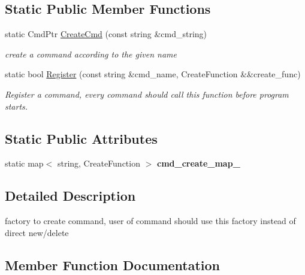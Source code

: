 \subsection*{Static Public Member Functions}
\begin{DoxyCompactItemize}
\item 
static Cmd\+Ptr \hyperlink{classwscmd_1_1CommandFactory_a3a2ff622076f7ed51fa44de220f61276}{Create\+Cmd} (const string \&cmd\+\_\+string)
\begin{DoxyCompactList}\small\item\em create a command according to the given {\ttfamily name} \end{DoxyCompactList}\item 
static bool \hyperlink{classwscmd_1_1CommandFactory_a3d750b11a80519e15f7e2efbc1f60528}{Register} (const string \&cmd\+\_\+name, Create\+Function \&\&create\+\_\+func)
\begin{DoxyCompactList}\small\item\em Register a command, every command should call this function before program starts. \end{DoxyCompactList}\end{DoxyCompactItemize}
\subsection*{Static Public Attributes}
\begin{DoxyCompactItemize}
\item 
\mbox{\label{classwscmd_1_1CommandFactory_a036760d988f21733db305c1777cb08a3}} 
static map$<$ string, Create\+Function $>$ {\bfseries cmd\+\_\+create\+\_\+map\+\_\+}
\end{DoxyCompactItemize}


\subsection{Detailed Description}
factory to create command, user of command should use this factory instead of direct new/delete 

\subsection{Member Function Documentation}
\mbox{\label{classwscmd_1_1CommandFactory_a3a2ff622076f7ed51fa44de220f61276}} 
